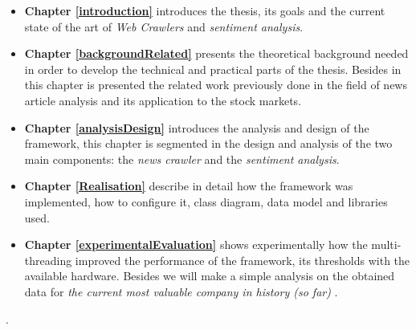 	\begin{itemize}
		\item \textbf{Chapter \ref{introduction}} introduces the thesis, its goals and the current state of the art of \emph{Web Crawlers} and \emph{sentiment analysis}.
		\item \textbf{Chapter \ref{backgroundRelated}} presents the theoretical background needed in order to develop the technical and practical parts of the thesis. Besides in this chapter is presented the related work previously done in the field of news article analysis and its application to the stock markets.
		\item \textbf{Chapter \ref{analysisDesign}} introduces the analysis and design of the framework, this chapter is segmented in the design and analysis of the two main components: the \emph{news crawler} and the \emph{sentiment analysis}.
		\item \textbf{Chapter \ref{Realisation}} describe in detail how the framework was implemented, how to configure it, class diagram, data model and libraries used.
		\item \textbf{Chapter \ref{experimentalEvaluation}} shows experimentally how the multi-threading improved the performance of the framework, its thresholds with the available hardware. Besides we will make a simple analysis on the obtained data for \emph{the current most valuable company in history (so far)} \cite{BE2012}.
	\end{itemize}
	
	
.
	
	
	
	
	
	
	
		



